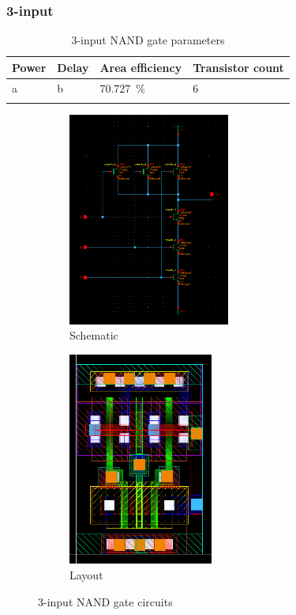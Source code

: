\subsubsection{3-input}
\begin{xltabular}{\textwidth}{YYYY}
    Power & Delay & Area efficiency & Transistor count \\
    \hline
    a & b & \qty{70.727}{\percent} & 6 \\
    \hline    
    \caption{3-input NAND gate parameters}
\end{xltabular}
\begin{figure}[H]
    \begin{subfigure}{0.6\textwidth}
        \centering
        \includegraphics[width=\textwidth,height=7cm,keepaspectratio]{./figures/nand3/schematic.png}
        \caption{Schematic}\label{fig:nand3schematic}
    \end{subfigure}
    \hfill
    \begin{subfigure}{0.4\textwidth}
        \centering
        \includegraphics[width=\textwidth,height=7cm,keepaspectratio]{./figures/nand3/layout.png}
        \caption{Layout}\label{fig:nand3layout}
    \end{subfigure}
    \caption{3-input NAND gate circuits}
    \end{figure}
    
